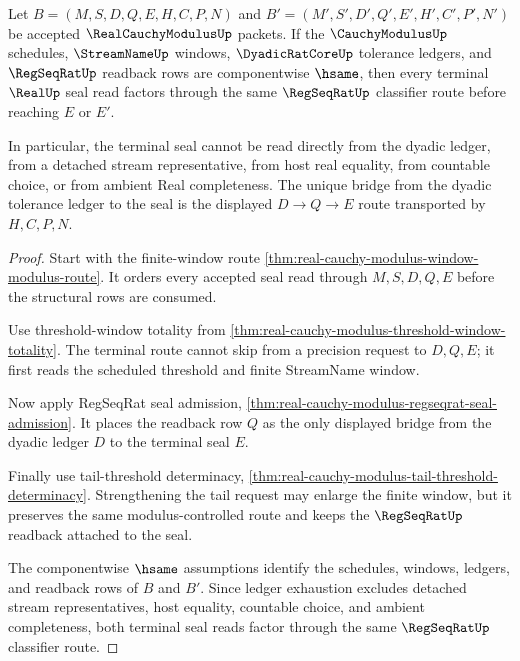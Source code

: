 \begin{theorem}
\label{thm:real-cauchy-modulus-regseqrat-classifier-determinacy}
Let $B=(M,S,D,Q,E,H,C,P,N)$ and $B'=(M',S',D',Q',E',H',C',P',N')$ be accepted $\RealCauchyModulusUp$ packets. If the $\CauchyModulusUp$ schedules, $\StreamNameUp$ windows, $\DyadicRatCoreUp$ tolerance ledgers, and $\RegSeqRatUp$ readback rows are componentwise $\hsame$, then every terminal $\RealUp$ seal read factors through the same $\RegSeqRatUp$ classifier route before reaching $E$ or $E'$.

In particular, the terminal seal cannot be read directly from the dyadic ledger, from a detached stream representative, from host real equality, from countable choice, or from ambient Real completeness. The unique bridge from the dyadic tolerance ledger to the seal is the displayed $D\to Q\to E$ route transported by $H,C,P,N$.
\end{theorem}
\begin{proof}
Start with the finite-window route \autoref{thm:real-cauchy-modulus-window-modulus-route}. It orders every accepted seal read through $M,S,D,Q,E$ before the structural rows are consumed.

Use threshold-window totality from \autoref{thm:real-cauchy-modulus-threshold-window-totality}. The terminal route cannot skip from a precision request to $D,Q,E$; it first reads the scheduled threshold and finite StreamName window.

Now apply RegSeqRat seal admission, \autoref{thm:real-cauchy-modulus-regseqrat-seal-admission}. It places the readback row $Q$ as the only displayed bridge from the dyadic ledger $D$ to the terminal seal $E$.

Finally use tail-threshold determinacy, \autoref{thm:real-cauchy-modulus-tail-threshold-determinacy}. Strengthening the tail request may enlarge the finite window, but it preserves the same modulus-controlled route and keeps the $\RegSeqRatUp$ readback attached to the seal.

The componentwise $\hsame$ assumptions identify the schedules, windows, ledgers, and readback rows of $B$ and $B'$. Since ledger exhaustion excludes detached stream representatives, host equality, countable choice, and ambient completeness, both terminal seal reads factor through the same $\RegSeqRatUp$ classifier route.
\end{proof}


